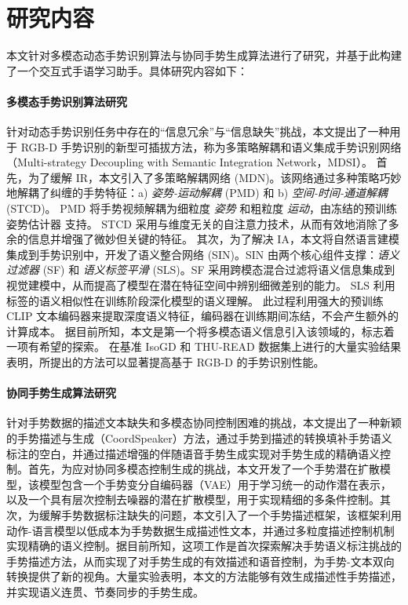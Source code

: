 \section{研究内容}

本文针对多模态动态手势识别算法与协同手势生成算法进行了研究，并基于此构建了一个交互式手语学习助手。具体研究内容如下：


\paragraph{多模态手势识别算法研究} 针对动态手势识别任务中存在的“信息冗余”与“信息缺失”挑战，本文提出了一种用于 RGB-D 手势识别的新型可插拔方法，称为多策略解耦和语义集成手势识别网络（Multi-strategy Decoupling with Semantic Integration Network，MDSI）。
首先，为了缓解 IR，本文引入了多策略解耦网络 (MDN)。该网络通过多种策略巧妙地解耦了纠缠的手势特征：a) \emph{姿势-运动解耦} (PMD) 和 b) \emph{空间-时间-通道解耦} (STCD)。
PMD 将手势视频解耦为细粒度 \emph{姿势} 和粗粒度 \emph{运动}，由冻结的预训练姿势估计器 \cite{sun2019deep} 支持。
STCD 采用与维度无关的自注意力技术，从而有效地消除了多余的信息并增强了微妙但关键的特征。
其次，为了解决 IA，本文将自然语言建模集成到手势识别中，开发了语义整合网络 (SIN)。SIN 由两个核心组件支撑：\emph{语义过滤器} (SF) 和 \emph{语义标签平滑} (SLS)。SF 采用跨模态混合过滤将语义信息集成到视觉建模中，从而提高了模型在潜在特征空间中辨别细微差别的能力。
SLS 利用标签的语义相似性在训练阶段深化模型的语义理解。
此过程利用强大的预训练 CLIP 文本编码器来提取深度语义特征，编码器在训练期间冻结，不会产生额外的计算成本。
据目前所知，本文是第一个将多模态语义信息引入该领域的，标志着一项有希望的探索。
在基准 IsoGD 和 THU-READ 数据集上进行的大量实验结果表明，所提出的方法可以显著提高基于 RGB-D 的手势识别性能。

\paragraph{协同手势生成算法研究} 
针对手势数据的描述文本缺失和多模态协同控制困难的挑战，本文提出了一种新颖的手势描述与生成（CoordSpeaker）方法，通过手势到描述的转换填补手势语义标注的空白，并通过描述增强的伴随语音手势生成实现对手势生成的精确语义控制。首先，为应对协同多模态控制生成的挑战，本文开发了一个手势潜在扩散模型，该模型包含一个手势变分自编码器（VAE）用于学习统一的动作潜在表示，以及一个具有层次控制去噪器的潜在扩散模型，用于实现精细的多条件控制。其次，为缓解手势数据标注缺失的问题，本文引入了一个手势描述框架，该框架利用动作-语言模型以低成本为手势数据生成描述性文本，并通过多粒度描述控制机制实现精确的语义控制。据目前所知，这项工作是首次探索解决手势语义标注挑战的手势描述方法，从而实现了对手势生成的有效描述和语音控制，为手势-文本双向转换提供了新的视角。大量实验表明，本文的方法能够有效生成描述性手势描述，并实现语义连贯、节奏同步的手势生成。

